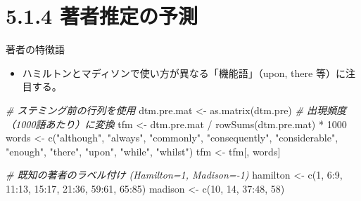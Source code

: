 \documentclass[
  ignorenonframetext,
]{beamer}
\newenvironment{Shaded}{\begin{snugshade}}{\end{snugshade}}
\newcommand{\CommentTok}[1]{\textcolor[rgb]{0.56,0.35,0.01}{\textit{#1}}}
\newcommand{\DecValTok}[1]{\textcolor[rgb]{0.00,0.00,0.81}{#1}}
\newcommand{\FunctionTok}[1]{\textcolor[rgb]{0.00,0.00,0.00}{#1}}
\newcommand{\NormalTok}[1]{#1}
\newcommand{\OtherTok}[1]{\textcolor[rgb]{0.56,0.35,0.01}{#1}}
\newcommand{\SpecialCharTok}[1]{\textcolor[rgb]{0.00,0.00,0.00}{#1}}
\newcommand{\StringTok}[1]{\textcolor[rgb]{0.31,0.60,0.02}{#1}}
\providecommand{\tightlist}{%
  \setlength{\itemsep}{0pt}\setlength{\parskip}{0pt}}
\begin{document}
\hypertarget{ux8457ux8005ux63a8ux5b9aux306eux4e88ux6e2c}{%
\section{5.1.4
著者推定の予測}\label{ux8457ux8005ux63a8ux5b9aux306eux4e88ux6e2c}}

\begin{frame}[fragile]{著者の特徴語}
\protect\hypertarget{ux8457ux8005ux306eux7279ux5fb4ux8a9e}{}
\begin{itemize}
\tightlist
\item
  ハミルトンとマディソンで使い方が異なる「機能語」（upon, there
  等）に注目する。
\end{itemize}

\scriptsize

\begin{Shaded}
\begin{Highlighting}[]
\CommentTok{\# ステミング前の行列を使用}
\NormalTok{dtm.pre.mat }\OtherTok{\textless{}{-}} \FunctionTok{as.matrix}\NormalTok{(dtm.pre)}
\CommentTok{\# 出現頻度（1000語あたり）に変換}
\NormalTok{tfm }\OtherTok{\textless{}{-}}\NormalTok{ dtm.pre.mat }\SpecialCharTok{/} \FunctionTok{rowSums}\NormalTok{(dtm.pre.mat) }\SpecialCharTok{*} \DecValTok{1000}
\NormalTok{words }\OtherTok{\textless{}{-}} \FunctionTok{c}\NormalTok{(}\StringTok{"although"}\NormalTok{, }\StringTok{"always"}\NormalTok{, }\StringTok{"commonly"}\NormalTok{, }\StringTok{"consequently"}\NormalTok{, }
           \StringTok{"considerable"}\NormalTok{, }\StringTok{"enough"}\NormalTok{, }\StringTok{"there"}\NormalTok{, }\StringTok{"upon"}\NormalTok{, }\StringTok{"while"}\NormalTok{, }\StringTok{"whilst"}\NormalTok{)}
\NormalTok{tfm }\OtherTok{\textless{}{-}}\NormalTok{ tfm[, words]}

\CommentTok{\# 既知の著者のラベル付け (Hamilton=1, Madison={-}1)}
\NormalTok{hamilton }\OtherTok{\textless{}{-}} \FunctionTok{c}\NormalTok{(}\DecValTok{1}\NormalTok{, }\DecValTok{6}\SpecialCharTok{:}\DecValTok{9}\NormalTok{, }\DecValTok{11}\SpecialCharTok{:}\DecValTok{13}\NormalTok{, }\DecValTok{15}\SpecialCharTok{:}\DecValTok{17}\NormalTok{, }\DecValTok{21}\SpecialCharTok{:}\DecValTok{36}\NormalTok{, }\DecValTok{59}\SpecialCharTok{:}\DecValTok{61}\NormalTok{, }\DecValTok{65}\SpecialCharTok{:}\DecValTok{85}\NormalTok{)}
\NormalTok{madison }\OtherTok{\textless{}{-}} \FunctionTok{c}\NormalTok{(}\DecValTok{10}\NormalTok{, }\DecValTok{14}\NormalTok{, }\DecValTok{37}\SpecialCharTok{:}\DecValTok{48}\NormalTok{, }\DecValTok{58}\NormalTok{)}
\end{Highlighting}
\end{Shaded}

\normalsize
\end{frame}
\end{document}
